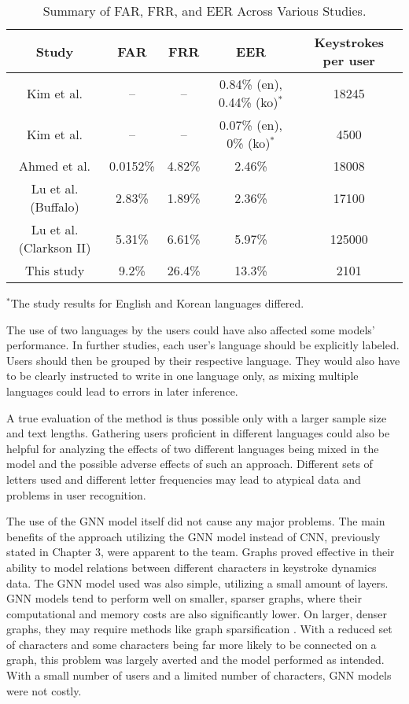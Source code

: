 \begin{center}
	\begin{table}[H]
		\begin{center}
			\begin{tabular}{ |c|c|c|c|c| } 
				\hline
				Study & FAR & FRR & EER & Keystrokes per user \\
				\hline
				Kim et al. \cite{kim2018} & -- & -- & 0.84\% (en), 0.44\% (ko)$^*$ & 18245 \\
				\hline
				Kim et al. \cite{kim2020} & -- & -- & 0.07\% (en), 0\% (ko)$^*$ & 4500 \\
				\hline
				Ahmed et al. \cite{ahmed2013} & 0.0152\% & 4.82\% & 2.46\% & 18008 \\
				\hline
				Lu et al. \cite{Lu2020} (Buffalo) & 2.83\% & 1.89\% & 2.36\% & 17100 \\
                \hline
                Lu et al. \cite{Lu2020} (Clarkson II) & 5.31\% & 6.61\% & 5.97\% & 125000 \\
                \hline
				This study & 9.2\% & 26.4\% & 13.3\% & 2101 \\
				\hline
			\end{tabular}
		\end{center}
		\caption{Summary of FAR, FRR, and EER Across Various Studies.}
		\label{table:studies_results}
	\end{table}
	\footnotesize $^*$The study results for English and Korean languages differed.
\end{center}

The use of two languages by the users could have also affected some models' performance. In further studies, each user's language should be explicitly labeled. Users should then be grouped by their respective language. They would also have to be clearly instructed to write in one language only, as mixing multiple languages could lead to errors in later inference. 

A true evaluation of the method is thus possible only with a larger sample size and text lengths. Gathering users proficient in different languages could also be helpful for analyzing the effects of two different languages being mixed in the model and the possible adverse effects of such an approach. Different sets of letters used and different letter frequencies may lead to atypical data and problems in user recognition.

The use of the GNN model itself did not cause any major problems. The main benefits of the approach utilizing the GNN model instead of CNN, previously stated in Chapter 3, were apparent to the team. Graphs proved effective in their ability to model relations between different characters in keystroke dynamics data. The GNN model used was also simple, utilizing a small amount of layers. GNN models tend to perform well on smaller, sparser graphs, where their computational and memory costs are also significantly lower. On larger, denser graphs, they may require methods like graph sparsification \cite{zhang2024graphsparsificationmixturegraphs}. With a reduced set of characters and some characters being far more likely to be connected on a graph, this problem was largely averted and the model performed as intended. With a small number of users and a limited number of characters, GNN models were not costly.